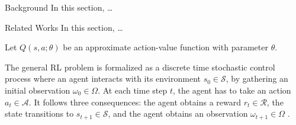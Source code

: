 \documentclass{article}
\begin{document}
\begin{section}{Background}
    \label{background}
    In this section, \dots
\end{section}

\begin{section}{Related Works}
    \label{review}
    In this section, \dots

    Let $Q(s,a;\theta)$ be an approximate action-value function with parameter $\theta$.
    
    The general RL problem is formalized as a discrete time stochastic control process where an agent interacts with its environment $s_0\in\mathcal{S}$, by gathering an initial observation $\omega_0\in\Omega$. At each time step $t$, the agent has to take an action $a_t\in\mathcal{A}$. It follows three consequences: the agent obtains a reward $r_t\in\mathcal{R}$, the state transitions to $s_{t+1}\in\mathcal{S}$, and the agent obtains an observation $\omega_{t+1}\in\Omega$ \cite{DBLP:journals/corr/abs-1811-12560}.
\end{section}
\end{document}
